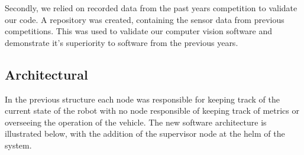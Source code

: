 \documentclass[11pt,journal]{IEEEtran}
\begin{document}
Secondly, we relied on recorded data from the past years competition to validate our code. A repository was created, containing the sensor data from previous competitions. This was used to validate our computer vision software and demonstrate it's superiority to software from the previous years.

\subsection{Architectural}
In the previous structure each node was responsible for keeping track of the current state of the robot with no node responsible of keeping track of metrics or overseeing the operation of the vehicle. The new software architecture is illustrated below, with the addition of the supervisor node at the helm of the system.
\end{document}
